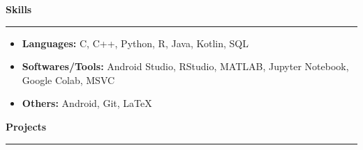 \documentclass[11pt]{article}
\begin{document}
    \textbf{\large{Skills}}
    \vspace{3pt}
    \hrule
    \begin{itemize}
        \setlength{\itemsep}{0pt}
        \setlength{\parskip}{0pt}
        \setlength{\parsep}{0pt}
        \item \textbf{Languages:} C, C++, Python, R, Java, Kotlin, SQL
        \item \textbf{Softwares/Tools:} Android Studio, RStudio, MATLAB, Jupyter Notebook, Google Colab, MSVC
        \item \textbf{Others:} Android, Git, \LaTeX
    \end{itemize}
    
    \textbf{\large{Projects}}
    \vspace{3pt}
    \hrule
    \vspace{6pt}
    
\end{document}

